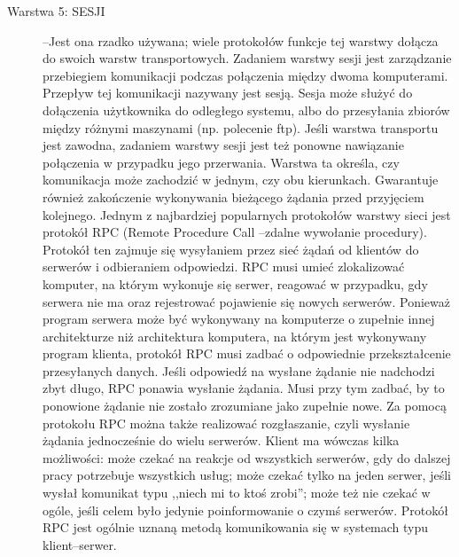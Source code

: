 \documentclass[a4paper,11pt]{article}
\begin{document}
\begin {description}
\item[Warstwa 5: SESJI]--Jest ona rzadko używana; wiele protokołów funkcje tej warstwy dołącza do swoich warstw transportowych. Zadaniem warstwy sesji jest zarządzanie przebiegiem komunikacji podczas połączenia między dwoma komputerami. Przepływ tej komunikacji nazywany jest sesją. Sesja może służyć do dołączenia użytkownika do odległego systemu, albo do przesyłania zbiorów między różnymi maszynami (np. polecenie ftp). Jeśli warstwa transportu jest zawodna, zadaniem warstwy sesji jest też ponowne nawiązanie połączenia w przypadku jego przerwania. Warstwa ta określa, czy komunikacja może zachodzić w jednym, czy obu kierunkach. Gwarantuje również zakończenie wykonywania bieżącego żądania przed przyjęciem kolejnego. Jednym z najbardziej popularnych protokołów warstwy sieci jest protokół RPC (Remote Procedure Call --zdalne wywołanie procedury). Protokół ten zajmuje się wysyłaniem przez sieć żądań od klientów do serwerów i odbieraniem odpowiedzi. RPC musi umieć zlokalizować komputer, na którym wykonuje się serwer, reagować w przypadku, gdy serwera nie ma oraz rejestrować pojawienie się nowych serwerów. Ponieważ program serwera może być wykonywany na komputerze o zupełnie innej architekturze niż architektura komputera, na którym jest wykonywany program klienta, protokół RPC musi zadbać o odpowiednie przekształcenie przesyłanych danych.  Jeśli odpowiedź na wysłane żądanie nie nadchodzi zbyt długo, RPC ponawia wysłanie żądania. Musi przy tym zadbać, by to ponowione żądanie nie zostało zrozumiane jako zupełnie nowe. Za pomocą protokołu RPC można także realizować rozgłaszanie, czyli wysłanie żądania jednocześnie do wielu serwerów. Klient ma wówczas kilka możliwości: może czekać na reakcje od wszystkich serwerów, gdy do dalszej pracy potrzebuje wszystkich usług; może czekać tylko na jeden serwer, jeśli wysłał komunikat typu ,,niech mi to ktoś zrobi''; może też nie czekać w ogóle, jeśli celem było jedynie poinformowanie o czymś serwerów. Protokół RPC jest ogólnie uznaną metodą komunikowania się w systemach typu klient--serwer. 


\end{description}
\end{document}
